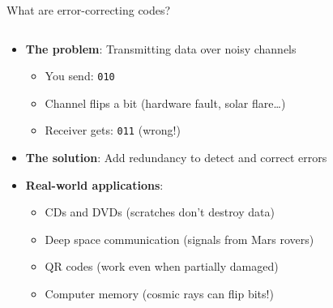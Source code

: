 \documentclass[aspectratio=169, lualatex, handout]{beamer}
\begin{document}
\begin{frame}{What are error-correcting codes?}
	\begin{columns}[c]
		\begin{column}{0.7\textwidth}
			\begin{itemize}
				\item \textbf{The problem}: Transmitting data over noisy channels
				      \begin{itemize}
					      \item You send: \texttt{010}
					      \item Channel flips a bit (hardware fault, solar flare\ldots)
					      \item Receiver gets: \texttt{011} (wrong!)
				      \end{itemize}
				\item \textbf{The solution}: Add redundancy to detect and correct errors
				\item \textbf{Real-world applications}:
				      \begin{itemize}
					      \item CDs and DVDs (scratches don't destroy data)
					      \item Deep space communication (signals from Mars rovers)
					      \item QR codes (work even when partially damaged)
					      \item Computer memory (cosmic rays can flip bits!)
				      \end{itemize}
			\end{itemize}
		\end{column}
		\begin{column}{0.3\textwidth}
		\end{column}
	\end{columns}

\end{frame}
\end{document}
